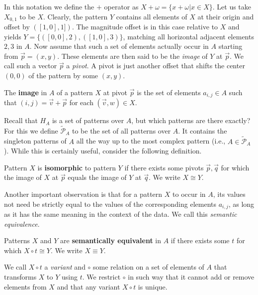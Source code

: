 \documentclass{llncs}
\begin{document}
In this notation we define the $+$ operator as $X+\omega=\{x + \omega | x \in X\}$. Let us take $X_{0,1}$ to be $X$. Clearly, the pattern $Y$ contains all elements of $X$ at their origin and offset by $([1,0],1])$. The magnitude offset is in this case relative to $X$ and yields $Y=\{([0,0],2),([1,0],3)\}$, matching all horizontal adjacent elements $2, 3$ in $A$. Now assume that such a set of elements actually occur in $A$ starting from $\vec{p}=(x,y)$. These elements are then said to be the \emph{image} of $Y$ at $\vec{p}$. We call such a vector $\vec{p}$ a \emph{pivot}. A pivot is just another offset that shifts the center $(0,0)$ of the pattern by some $(x,y)$.
\begin{definition}
The \textbf{image} in $A$ of a pattern $X$ at pivot $\vec{p}$ is the set of elements $a_{i,j}\in A$ such that $(i,j)=\vec{v}+\vec{p}$ for each $(\vec{v},w) \in X$. 
\end{definition}

Recall that $H_A$ is a set of patterns over $A$, but which patterns are there exactly? For this we define $\tilde{\mathcal{P}}_A$ to be the set of all patterns over $A$. It contains the singleton patterns of $A$ all the way up to the most complex pattern (i.e., $A\in \tilde{\mathcal{P}}_A$). While this is certainly useful, consider the following definition. 
\begin{definition}
Pattern $X$ is \textbf{isomorphic} to pattern $Y$ if there exists some pivots $\vec{p},\vec{q}$ for which the image of $X$ at $\vec{p}$ equals the image of $Y$ at $\vec{q}$. We write $X\cong Y$.
\end{definition}

Another important observation is that for a pattern $X$ to occur in $A$, its values not need be strictly equal to the values of the corresponding elements $a_{i,j}$, as long as it has the same meaning in the context of the data. We call this \emph{semantic equivalence}.
\begin{definition}
Patterns $X$ and $Y$ are \textbf{semantically equivalent} in $A$ if there exists some $t$ for which ${X\circ t}\cong Y$. We write $X\equiv Y$. 
\end{definition}
\noindent We call $X\circ t$ a \emph{variant} and $\circ$ some relation on a set of elements of $A$ that transforms $X$ to $Y$ using $t$. We restrict $\circ$ in such way that it cannot add or remove elements from $X$ and that any variant $X\circ t$ is unique.
\end{document}
